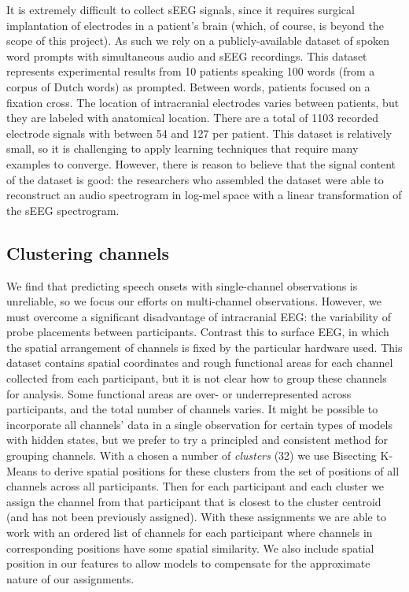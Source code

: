 \documentclass[format=sigconf, nonacm=true, review=true, screen=true]{acmart}
\begin{document}
It is extremely difficult to collect sEEG signals, since it requires surgical implantation of electrodes in a patient's brain (which, of course, is beyond the scope of this project). As such we rely on a publicly-available dataset of spoken word prompts with simultaneous audio and sEEG recordings. \cite{verwoert2022dataset} This dataset represents experimental results from 10 patients speaking 100 words (from a corpus of Dutch words) as prompted. Between words, patients focused on a fixation cross. The location of intracranial electrodes varies between patients, but they are labeled with anatomical location. There are a total of 1103 recorded electrode signals with between 54 and 127 per patient. This dataset is relatively small, so it is challenging to apply learning techniques that require many examples to converge. However, there is reason to believe that the signal content of the dataset is good: the researchers who assembled the dataset were able to reconstruct an audio spectrogram in log-mel space with a linear transformation of the sEEG spectrogram.

\subsection{Clustering channels}

We find that predicting speech onsets with single-channel observations is unreliable, so we focus our efforts on multi-channel observations. However, we must overcome a significant disadvantage of intracranial EEG: the variability of probe placements between participants. Contrast this to surface EEG, in which the spatial arrangement of channels is fixed by the particular hardware used. This dataset contains spatial coordinates and rough functional areas for each channel collected from each participant, but it is not clear how to group these channels for analysis. Some functional areas are over- or underrepresented across participants, and the total number of channels varies. It might be possible to incorporate all channels' data in a single observation for certain types of models with hidden states, but we prefer to try a principled and consistent method for grouping channels. With a chosen a number of \textit{clusters} (32) we use Bisecting K-Means to derive spatial positions for these clusters from the set of positions of all channels across all participants. Then for each participant and each cluster we assign the channel from that participant that is closest to the cluster centroid (and has not been previously assigned). With these assignments we are able to work with an ordered list of channels for each participant where channels in corresponding positions have some spatial similarity. We also include spatial position in our features to allow models to compensate for the approximate nature of our assignments.
\end{document}
